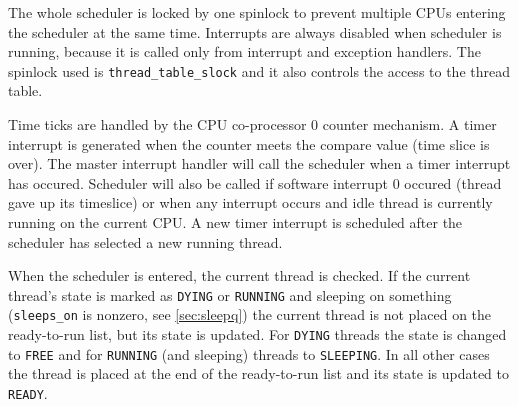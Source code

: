 \documentclass[twoside,a4paper]{report}
\begin{document}
The whole scheduler is locked by one spinlock to prevent multiple CPUs
entering the scheduler at the same time. Interrupts are always disabled
when scheduler is running, because it is called only from interrupt
and exception handlers. The spinlock used is
\texttt{thread\_table\_slock} and it also controls the access to the
thread table.

Time ticks are handled by the CPU co-processor 0 counter mechanism. A timer
interrupt is generated when the counter meets the compare value (time slice
is over). The master interrupt handler will call the scheduler when a timer
interrupt has occured. Scheduler will also be called if software
interrupt 0 occured (thread gave up its timeslice) or when any
interrupt occurs and idle thread is currently running on the current CPU.
A new timer interrupt is scheduled after the scheduler has selected a new
running thread.

When the scheduler is entered, the current thread is checked. If the
current thread's state is marked as \texttt{DYING} or \texttt{RUNNING}
and sleeping on something (\texttt{sleeps\_on}
 is nonzero, see
\autoref{sec:sleepq}) the current thread is not placed on the
ready-to-run list, but its state is updated. For \texttt{DYING}
threads the state is changed to \texttt{FREE} and for \texttt{RUNNING}
(and sleeping) threads to \texttt{SLEEPING}. In all other cases the
thread is placed at the end of the ready-to-run list and its state is
updated to \texttt{READY}.
\end{document}

